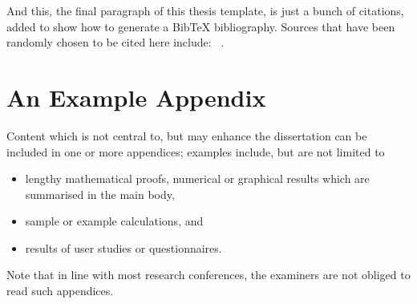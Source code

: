 \documentclass{dissertation}
\begin{document}
And this, the final paragraph of this thesis template, is just a bunch of citations, added to show how to generate a BibTeX bibliography. Sources that have been randomly chosen to be cited here include:
~\cite{miller_etal_2018_clojure,webber_marwan_2015,touretzky_2013_lisp,eckmann_etal_1987,marwan_2011,vach_2015,shiller_2017,vytelingum_2006,tesfatsion_2002,rust_etal_1992}.





%
%

\backmatter





\appendix

\chapter{An Example Appendix}
\label{appx:example}

Content which is not central to, but may enhance the dissertation can be 
included in one or more appendices; examples include, but are not limited
to

\begin{itemize}
\item lengthy mathematical proofs, numerical or graphical results which 
      are summarised in the main body,
\item sample or example calculations, 
      and
\item results of user studies or questionnaires.
\end{itemize}

\noindent
Note that in line with most research conferences, the examiners are not
obliged to read such appendices.

\end{document}
